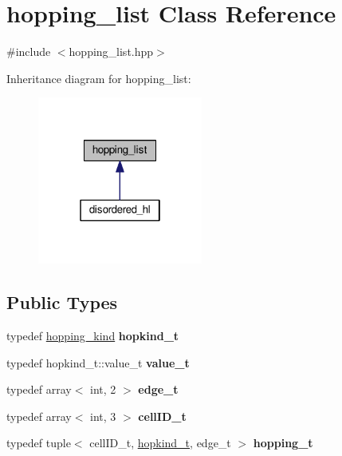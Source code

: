 \hypertarget{classhopping__list}{}\section{hopping\+\_\+list Class Reference}
\label{classhopping__list}


{\ttfamily \#include $<$hopping\+\_\+list.\+hpp$>$}



Inheritance diagram for hopping\+\_\+list\+:\nopagebreak
\begin{figure}[H]
\begin{center}
\leavevmode
\includegraphics[width=154pt]{classhopping__list__inherit__graph}
\end{center}
\end{figure}
\subsection*{Public Types}
\begin{DoxyCompactItemize}
\item 
typedef \hyperlink{classhopping__kind}{hopping\+\_\+kind} {\bfseries hopkind\+\_\+t}\hypertarget{classhopping__list_add5e4657724bc845ddac46d72a595feb}{}\label{classhopping__list_add5e4657724bc845ddac46d72a595feb}

\item 
typedef hopkind\+\_\+t\+::value\+\_\+t {\bfseries value\+\_\+t}\hypertarget{classhopping__list_af135e2651c597b6aab5ed797898fb974}{}\label{classhopping__list_af135e2651c597b6aab5ed797898fb974}

\item 
typedef array$<$ int, 2 $>$ {\bfseries edge\+\_\+t}\hypertarget{classhopping__list_abc3b58fecac198fd51d62c72ce97dcc5}{}\label{classhopping__list_abc3b58fecac198fd51d62c72ce97dcc5}

\item 
typedef array$<$ int, 3 $>$ {\bfseries cell\+I\+D\+\_\+t}\hypertarget{classhopping__list_a2a22c580c766f39bf5cc017b997e45a0}{}\label{classhopping__list_a2a22c580c766f39bf5cc017b997e45a0}

\item 
typedef tuple$<$ cell\+I\+D\+\_\+t, \hyperlink{classhopping__kind}{hopkind\+\_\+t}, edge\+\_\+t $>$ {\bfseries hopping\+\_\+t}\hypertarget{classhopping__list_a9ea94139b2c4de15b44d8b9701ef2983}{}\label{classhopping__list_a9ea94139b2c4de15b44d8b9701ef2983}

\end{DoxyCompactItemize}
